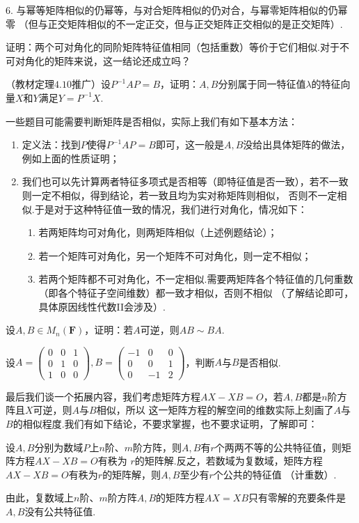 6. 与幂等矩阵相似的仍幂等，与对合矩阵相似的仍对合，与幂零矩阵相似的仍幂零
（但与正交矩阵相似的不一定正交，但与正交矩阵正交相似的是正交矩阵）.
\begin{example}
	证明：两个可对角化的同阶矩阵特征值相同（包括重数）等价于它们相似.对于不可对角化的矩阵来说，这一结论还成立吗？
\end{example}
\begin{example}
	（教材定理$4.10$推广）设$P^{-1}AP=B$，证明：$A,B$分别属于同一特征值$\lambda$的特征向量$X$和$Y$满足$Y=P^{-1}X$.
\end{example}
一些题目可能需要判断矩阵是否相似，实际上我们有如下基本方法：
\begin{enumerate}
	\item 定义法：找到$P$使得$P^{-1}AP=B$即可，这一般是$A,B$没给出具体矩阵的做法，例如上面的性质证明；
	\item 我们也可以先计算两者特征多项式是否相等（即特征值是否一致），若不一致则一定不相似，得到结论，若一致且均为实对称矩阵则相似，
	否则不一定相似.于是对于这种特征值一致的情况，我们进行对角化，情况如下：
	\begin{enumerate}
		\item 若两矩阵均可对角化，则两矩阵相似（上述例题结论）；
		\item 若一个矩阵可对角化，另一个矩阵不可对角化，则一定不相似；
		\item 若两个矩阵都不可对角化，不一定相似.需要两矩阵各个特征值的几何重数（即各个特征子空间维数）都一致才相似，否则不相似
		（了解结论即可，具体原因线性代数II会涉及）.
	\end{enumerate}
\end{enumerate}
\begin{example}
	设$A,B\in M_n(\mathbf{F})$，证明：若$A$可逆，则$AB\sim BA$.
\end{example}
\begin{example}
	设$A=\begin{pmatrix}
		0 & 0 & 1 \\ 0 & 1 & 0 \\ 1 & 0 & 0
	\end{pmatrix},B=\begin{pmatrix}
		-1 & 0 & 0 \\ 0 & 0 & 1 \\ 0 & -1 & 2
	\end{pmatrix}$，判断$A$与$B$是否相似.
\end{example}
最后我们谈一个拓展内容，我们考虑矩阵方程$AX-XB=O$，若$A,B$都是$n$阶方阵且$X$可逆，则$A$与$B$相似，所以
这一矩阵方程的解空间的维数实际上刻画了$A$与$B$的相似程度.我们有如下结论，不要求掌握，也不要求证明，了解即可：
\begin{theorem}
	设$A,B$分别为数域$P$上$n$阶、$m$阶方阵，则$A,B$有$r$个两两不等的公共特征值，则矩阵方程$AX-XB=O$有秩为
	$r$的矩阵解.反之，若数域为复数域，矩阵方程$AX-XB=O$有秩为$r$的矩阵解，则$A,B$至少有$r$个公共的特征值
	（计重数）.
\end{theorem}
由此，复数域上$n$阶、$m$阶方阵$A,B$的矩阵方程$AX=XB$只有零解的充要条件是$A,B$没有公共特征值.
